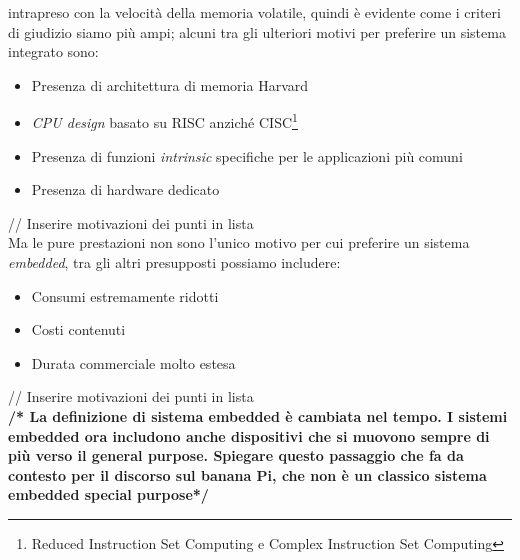 intrapreso con la velocità della memoria volatile, quindi è evidente come i
criteri di giudizio siamo più ampi; alcuni tra gli ulteriori  motivi per 
preferire un sistema integrato sono:
\begin{itemize}
\item Presenza di architettura di memoria Harvard
\item \emph{CPU design} basato su RISC anziché CISC\footnote{Reduced 
Instruction Set Computing e Complex Instruction Set Computing}
\item Presenza di funzioni \emph{intrinsic} specifiche per le applicazioni più 
comuni
\item Presenza di hardware dedicato
\end{itemize}
// Inserire motivazioni dei punti in lista \\
Ma le pure prestazioni non sono l'unico motivo per cui preferire un sistema 
\emph{embedded}, tra gli altri presupposti possiamo includere:
\begin{itemize}
\item Consumi estremamente ridotti
\item Costi contenuti
\item Durata commerciale molto estesa
\end{itemize}
// Inserire motivazioni dei punti in lista
\\ \textbf{/* La definizione di sistema embedded è cambiata nel tempo. I 
sistemi 
embedded ora includono anche dispositivi che si muovono sempre di più verso il 
general purpose. Spiegare questo passaggio che fa da contesto per il discorso 
sul banana Pi, che non è un classico sistema embedded special purpose*/}
\newpage
